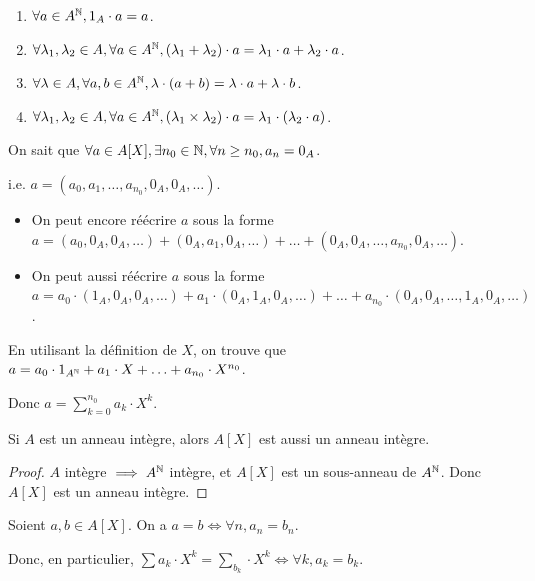 \documentclass[12pt,a4paper]{report}
\begin{document}
\begin{property}
    \begin{enumerate}
        \item $\forall a \in A^{\mathbb{N}}, 1_A \cdot a = a$.
        \item $\forall \lambda_1,\lambda_2 \in A, \forall a \in A^{\mathbb{N}}, (\lambda_1 + \lambda_2) \cdot a = \lambda_1 \cdot a + \lambda_2 \cdot a$.
        \item $\forall \lambda \in A, \forall a,b \in A^{\mathbb{N}}, \lambda \cdot (a + b) = \lambda \cdot a + \lambda \cdot b$.
        \item $\forall \lambda_1,\lambda_2 \in A, \forall a \in A^{\mathbb{N}}, (\lambda_1 \times \lambda_2) \cdot a = \lambda_1 \cdot (\lambda_2 \cdot a)$.
    \end{enumerate}

    On sait que $\forall a \in A[X], \exists n_0 \in \mathbb{N}, \forall n \ge n_0, a_n = 0_A$.

    i.e. $a = (a_0, a_1, \ldots, a_{n_0}, 0_A, 0_A, \ldots)$.

    \begin{itemize}
        \item On peut encore réécrire $a$ sous la forme $a = (a_0, 0_A, 0_A, \ldots) + (0_A, a_1, 0_A, \ldots) + \ldots + (0_A, 0_A, \ldots, a_{n_0}, 0_A, \ldots)$.

        \item On peut aussi réécrire $a$ sous la forme $a = a_0 \cdot (1_A, 0_A, 0_A, \ldots) + a_1 \cdot (0_A, 1_A, 0_A, \ldots) + \ldots + a_{n_0} \cdot (0_A, 0_A, \ldots, 1_A, 0_A, \ldots)$.
    \end{itemize}

    En utilisant la définition de $X$, on trouve que $a = a_0 \cdot 1_{A^{\mathbb{N}}} + a_1 \cdot X + \ldots + a_{n_0} \cdot X^{n_0}$.

    Donc $a = \sum_{k=0}^{n_0}a_k \cdot X^k$.
\end{property}

\begin{property}
    Si $A$ est un anneau intègre, alors $A[X]$ est aussi un anneau intègre.
\end{property}

\begin{proof}
    $A$ intègre $\implies A^{\mathbb{N}}$ intègre, et $A[X]$ est un sous-anneau de $A^{\mathbb{N}}$. Donc $A[X]$ est un anneau intègre.
\end{proof}

\begin{property}
    Soient $a,b \in A[X]$. On a $a = b \iff \forall n, a_n = b_n$.

    Donc, en particulier, $\sum a_k\cdot X^k = \sum_{b_k}\cdot X^k \iff \forall k, a_k = b_k$.
\end{property}
\end{document}
